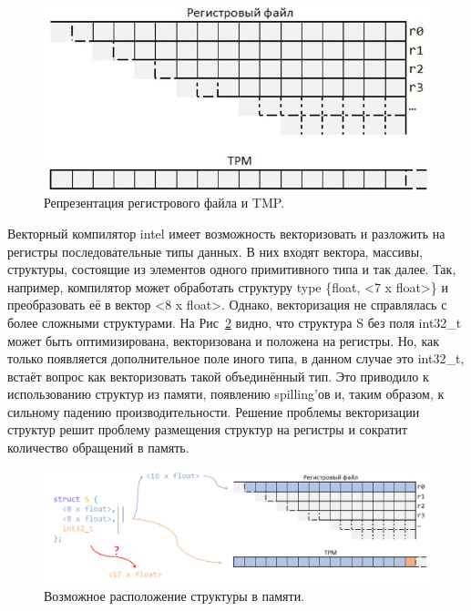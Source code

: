 \begin{figure}[h]
    \centering
    \includegraphics[scale=0.35]{Images/reg_and_tpm.png}
    \caption{Репрезентация регистрового файла и TMP.}
    \label{fig:mem}
\end{figure}

Векторный компилятор intel имеет возможность векторизовать и разложить на регистры последовательные типы данных. В них входят вектора, массивы, структуры, состоящие из элементов одного примитивного типа и так далее. Так, например, компилятор может обработать структуру type \{float, <7 x float>\} и преобразовать её в вектор <8 x float>. Однако, векторизация не справлялась с более сложными структурами. На Рис~\ref{fig:lying} видно, что структура S без поля int32\_t может быть оптимизирована, векторизована и положена на регистры. Но, как только появляется дополнительное поле иного типа, в данном случае это int32\_t, встаёт вопрос как векторизовать такой объединённый тип. Это приводило к использованию структур из памяти, появлению spilling'ов и, таким образом, к сильному падению производительности. Решение проблемы векторизации структур решит проблему размещения структур на регистры и сократит количество обращений в память.

\begin{figure}[ht]
    \centering
    \includegraphics[scale=0.21]{Images/reg_and_tpm_lying.png}
    \caption{Возможное расположение структуры в памяти.}
    \label{fig:lying}
\end{figure}

